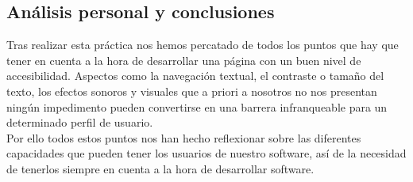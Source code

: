\subsection{Análisis personal y conclusiones}
Tras realizar esta práctica nos hemos percatado de todos los puntos que hay que tener en cuenta a la hora de desarrollar una página con un buen nivel de accesibilidad. Aspectos como la navegación textual, el contraste o tamaño del texto, los efectos sonoros y visuales que a priori a nosotros no nos presentan ningún impedimento pueden convertirse en una barrera infranqueable para un determinado perfil de usuario.\\
Por ello todos estos puntos nos han hecho reflexionar sobre las diferentes capacidades que pueden tener los usuarios de nuestro software, así de la necesidad de tenerlos siempre en cuenta a la hora de desarrollar software.